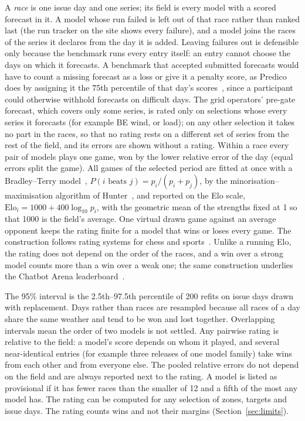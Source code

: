 \documentclass[11pt,a4paper]{article}
\begin{document}
A \emph{race} is one issue day and one series; its field is every model with a scored forecast in it. A model whose
run failed is left out of that race rather than ranked last (the run tracker on the site shows every failure), and a
model joins the races of the series it declares from the day it is added. Leaving failures out is defensible only
because the benchmark runs every entry itself: an entry cannot choose the days on which it forecasts. A benchmark that
accepted submitted forecasts would have to count a missing forecast as a loss or give it a penalty score, as Predico does by assigning it the 75th
percentile of that day's scores~\cite{predico}, since a participant could otherwise withhold forecasts on difficult days. The grid operators' pre-gate forecast, which
covers only some series, is rated only on selections whose every series it forecasts (for example BE wind, or load); on
any other selection it takes no part in the races, so that no rating rests on a different set of series from the
rest of the field, and its errors are shown without a rating. Within a race every pair of models plays
one game, won by the lower relative error of the day (equal errors split the game). All games of the selected period
are fitted at once with a Bradley--Terry model~\cite{bradleyterry}, $P(i \text{ beats } j) = p_i/(p_i+p_j)$, by the
minorisation--maximisation algorithm of Hunter~\cite{hunter}, and reported on the Elo scale,
$\mathrm{Elo}_i = 1000 + 400\log_{10} p_i$, with the geometric mean of the strengths fixed at 1 so that 1000 is the
field's average. One virtual drawn game against an average opponent keeps the rating finite for a model that wins or
loses every game. The construction follows rating systems for chess and sports~\cite{elo1978}. Unlike a running Elo, the rating does
not depend on the order of the races, and a win over a strong
model counts more than a win over a weak one; the same construction underlies the Chatbot Arena
leaderboard~\cite{chatbotarena}.

The 95\% interval is the 2.5th--97.5th percentile of 200 refits on issue days drawn with replacement. Days rather than
races are resampled because all races of a day share the same weather and tend to be won and lost together.
Overlapping intervals mean the order of two models is not settled. Any pairwise rating is relative to the field: a model's score depends on whom it
played, and several near-identical entries (for example three releases of one model family) take wins from each other and
from everyone else. The pooled relative errors do not depend on the field and are always reported next to the rating. A model is listed as provisional if it has fewer races than the smaller of 12 and a fifth of the most
any model has. The rating can be computed for any selection of zones, targets and issue days. The rating counts
wins and not their margins (Section~\ref{sec:limits}).
\end{document}
